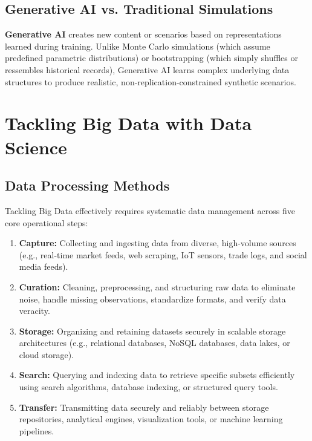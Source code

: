 \subsection{Generative AI vs. Traditional Simulations}
\textbf{Generative AI} creates new content or scenarios based on representations learned during training. Unlike Monte Carlo simulations (which assume predefined parametric distributions) or bootstrapping (which simply shuffles or ressembles historical records), Generative AI learns complex underlying data structures to produce realistic, non-replication-constrained synthetic scenarios.

\section{Tackling Big Data with Data Science}
\label{sec:Tackling Big Data with Data Science}

\subsection{Data Processing Methods}
Tackling Big Data effectively requires systematic data management across five core operational steps:
\begin{enumerate}[noitemsep, topsep=2pt, parsep=0pt]
	\item \textbf{Capture:} Collecting and ingesting data from diverse, high-volume sources (e.g., real-time market feeds, web scraping, IoT sensors, trade logs, and social media feeds).
	\item \textbf{Curation:} Cleaning, preprocessing, and structuring raw data to eliminate noise, handle missing observations, standardize formats, and verify data veracity.
	\item \textbf{Storage:} Organizing and retaining datasets securely in scalable storage architectures (e.g., relational databases, NoSQL databases, data lakes, or cloud storage).
	\item \textbf{Search:} Querying and indexing data to retrieve specific subsets efficiently using search algorithms, database indexing, or structured query tools.
	\item \textbf{Transfer:} Transmitting data securely and reliably between storage repositories, analytical engines, visualization tools, or machine learning pipelines.
\end{enumerate}

